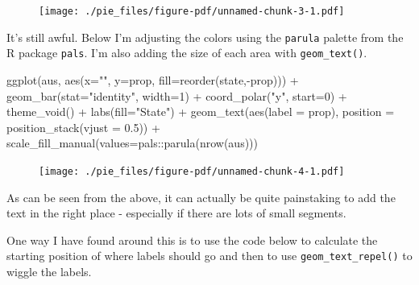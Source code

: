 \documentclass[
  letterpaper,
  DIV=11,
  numbers=noendperiod]{scrreprt}
\newenvironment{Shaded}{\begin{snugshade}}{\end{snugshade}}
\newcommand{\AttributeTok}[1]{\textcolor[rgb]{0.40,0.45,0.13}{#1}}
\newcommand{\DecValTok}[1]{\textcolor[rgb]{0.68,0.00,0.00}{#1}}
\newcommand{\FloatTok}[1]{\textcolor[rgb]{0.68,0.00,0.00}{#1}}
\newcommand{\FunctionTok}[1]{\textcolor[rgb]{0.28,0.35,0.67}{#1}}
\newcommand{\NormalTok}[1]{\textcolor[rgb]{0.00,0.23,0.31}{#1}}
\newcommand{\SpecialCharTok}[1]{\textcolor[rgb]{0.37,0.37,0.37}{#1}}
\newcommand{\StringTok}[1]{\textcolor[rgb]{0.13,0.47,0.30}{#1}}
\begin{document}
\begin{figure}[H]

{\centering \texttt{[image: ./pie\_files/figure-pdf/unnamed-chunk-3-1.pdf]}

}

\end{figure}

It's still awful. Below I'm adjusting the colors using the
\texttt{parula} palette from the R package \texttt{pals}. I'm also
adding the size of each area with \texttt{geom\_text()}.

\begin{Shaded}
\begin{Highlighting}[]
\FunctionTok{ggplot}\NormalTok{(aus, }\FunctionTok{aes}\NormalTok{(}\AttributeTok{x=}\StringTok{""}\NormalTok{, }\AttributeTok{y=}\NormalTok{prop, }\AttributeTok{fill=}\FunctionTok{reorder}\NormalTok{(state,}\SpecialCharTok{{-}}\NormalTok{prop))) }\SpecialCharTok{+}
  \FunctionTok{geom\_bar}\NormalTok{(}\AttributeTok{stat=}\StringTok{"identity"}\NormalTok{, }\AttributeTok{width=}\DecValTok{1}\NormalTok{) }\SpecialCharTok{+}
  \FunctionTok{coord\_polar}\NormalTok{(}\StringTok{"y"}\NormalTok{, }\AttributeTok{start=}\DecValTok{0}\NormalTok{) }\SpecialCharTok{+}
  \FunctionTok{theme\_void}\NormalTok{() }\SpecialCharTok{+}
  \FunctionTok{labs}\NormalTok{(}\AttributeTok{fill=}\StringTok{"State"}\NormalTok{) }\SpecialCharTok{+}
  \FunctionTok{geom\_text}\NormalTok{(}\FunctionTok{aes}\NormalTok{(}\AttributeTok{label =}\NormalTok{ prop), }\AttributeTok{position =} \FunctionTok{position\_stack}\NormalTok{(}\AttributeTok{vjust =} \FloatTok{0.5}\NormalTok{)) }\SpecialCharTok{+}
  \FunctionTok{scale\_fill\_manual}\NormalTok{(}\AttributeTok{values=}\NormalTok{pals}\SpecialCharTok{::}\FunctionTok{parula}\NormalTok{(}\FunctionTok{nrow}\NormalTok{(aus)))}
\end{Highlighting}
\end{Shaded}

\begin{figure}[H]

{\centering \texttt{[image: ./pie\_files/figure-pdf/unnamed-chunk-4-1.pdf]}

}

\end{figure}

As can be seen from the above, it can actually be quite painstaking to
add the text in the right place - especially if there are lots of small
segments.

One way I have found around this is to use the code below to calculate
the starting position of where labels should go and then to use
\texttt{geom\_text\_repel()} to wiggle the labels.
\end{document}
